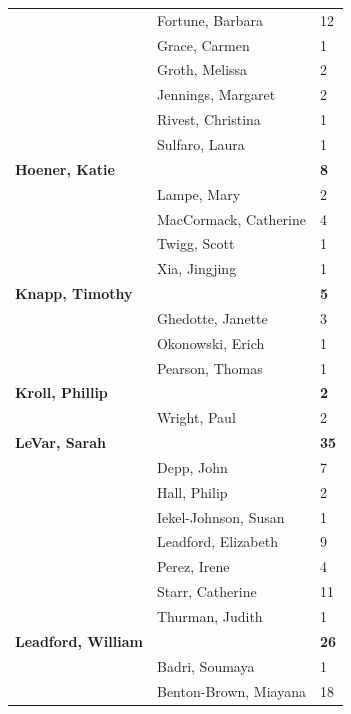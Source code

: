 \documentclass{article}\usepackage[]{graphicx}\usepackage[]{color}
\begin{document}
{\begin{longtable} { >{\raggedright}p{}|p{}p{}}
   & Fortune, Barbara & 12 \\ 
   \rowcolor[gray]{0.90} & Grace, Carmen & 1 \\ 
   \rowcolor[gray]{0.90} & Groth, Melissa & 2 \\ 
   \rowcolor[gray]{0.90} & Jennings, Margaret & 2 \\ 
   & Rivest, Christina & 1 \\ 
   & Sulfaro, Laura & 1 \\ 
  \textbf{Hoener, Katie} &  & \hspace{2cm}\textbf{8} \\ 
   \rowcolor[gray]{0.90} & Lampe, Mary & 2 \\ 
   \rowcolor[gray]{0.90} & MacCormack, Catherine & 4 \\ 
   \rowcolor[gray]{0.90} & Twigg, Scott & 1 \\ 
   & Xia, Jingjing & 1 \\ 
  \textbf{Knapp, Timothy} &  & \hspace{2cm}\textbf{5} \\ 
   & Ghedotte, Janette & 3 \\ 
   \rowcolor[gray]{0.90} & Okonowski, Erich & 1 \\ 
   \rowcolor[gray]{0.90} & Pearson, Thomas & 1 \\ 
   \rowcolor[gray]{0.90}\textbf{Kroll, Phillip} &  & \hspace{2cm}\textbf{2} \\ 
   & Wright, Paul & 2 \\ 
  \textbf{LeVar, Sarah} &  & \hspace{2cm}\textbf{35} \\ 
   & Depp, John & 7 \\ 
   \rowcolor[gray]{0.90} & Hall, Philip & 2 \\ 
   \rowcolor[gray]{0.90} & Iekel-Johnson, Susan & 1 \\ 
   \rowcolor[gray]{0.90} & Leadford, Elizabeth & 9 \\ 
   & Perez, Irene & 4 \\ 
   & Starr, Catherine & 11 \\ 
   & Thurman, Judith & 1 \\ 
   \rowcolor[gray]{0.90}\textbf{Leadford, William} &  & \hspace{2cm}\textbf{26} \\ 
   \rowcolor[gray]{0.90} & Badri, Soumaya & 1 \\ 
   \rowcolor[gray]{0.90} & Benton-Brown, Miayana & 18 \\ 

\end{longtable}}
\end{document}
